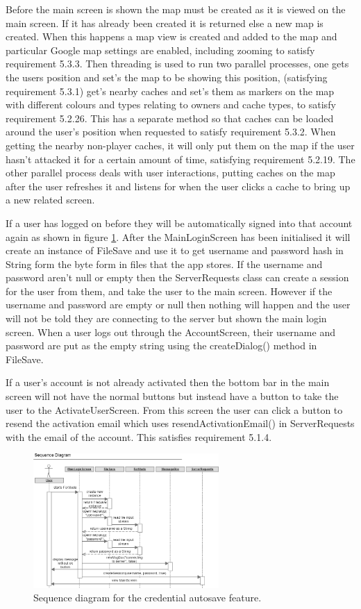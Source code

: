 Before the main screen is shown the map must be created as it is viewed on the main screen. If it has already been created it is returned else a new map is created. When this happens a map view is created and added to the map and particular Google map settings are enabled, including zooming to satisfy requirement 5.3.3. Then threading is used to run two parallel processes, one gets the users position and set's the map to be showing this position, (satisfying requirement 5.3.1) get's nearby caches and set's them as markers on the map with different colours and types relating to owners and cache types, to satisfy requirement 5.2.26. This has a separate method so that caches can be loaded around the user's position when requested to satisfy requirement 5.3.2. When getting the nearby non-player caches, it will only put them on the map if the user hasn't attacked it for a certain amount of time, satisfying requirement 5.2.19. The other parallel process deals with user interactions, putting caches on the map after the user refreshes it and listens for when the user clicks a cache to bring up a new related screen.

If a user has logged on before they will be automatically signed into that account again as shown in figure \ref{fig:autosave}. After the MainLoginScreen has been initialised it will create an instance of FileSave and use it to get username and password hash in String form the byte form in files that the app stores. If the username and password aren't null or empty then the ServerRequests class can create a session for the user from them, and take the user to the main screen. However if the username and password are empty or null then nothing will happen and the user will not be told they are connecting to the server but shown the main login screen. When a user logs out through the AccountScreen, their username and password are put as the empty string using the createDialog() method in FileSave.

If a user's account is not already activated then the bottom bar in the main screen will not have the normal buttons but instead have a button to take the user to the ActivateUserScreen. From this screen the user can click a button to resend the activation email which uses resendActivationEmail() in ServerRequests with the email of the account. This satisfies requirement 5.1.4.

\begin{figure}
    \includegraphics[width=0.63\textwidth]{images/sequence/autosave}
    \caption{Sequence diagram for the credential autosave feature.}
    \label{fig:autosave}
\end{figure}

